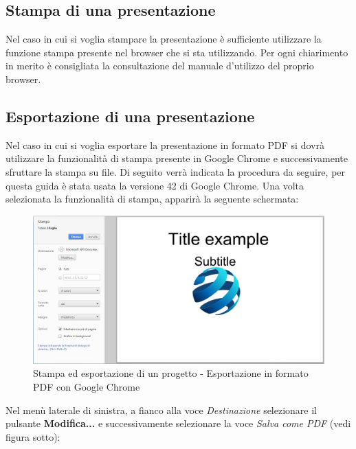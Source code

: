 \subsection{Stampa di una presentazione}
\noindent Nel caso in cui si voglia stampare la presentazione è sufficiente utilizzare la funzione stampa presente nel browser che si sta utilizzando. Per ogni chiarimento in merito è consigliata la consultazione del manuale d'utilizzo del proprio browser. 

\subsection{Esportazione di una presentazione}
Nel caso in cui si voglia esportare la presentazione in formato PDF si dovrà utilizzare la funzionalità di stampa presente in Google Chrome e successivamente sfruttare la stampa su file. Di seguito verrà indicata la procedura da seguire, per questa guida è stata usata la versione 42 di Google Chrome. Una volta selezionata la funzionalità di stampa, apparirà la seguente schermata:

\begin{figure}[H] 
	\centering 
	\includegraphics[scale=0.40] {img/print_google}
	\caption{Stampa ed esportazione di un progetto - Esportazione in formato PDF con Google Chrome} 
\end{figure}

\noindent Nel menù laterale di sinistra, a fianco alla voce \textit{Destinazione} selezionare il pulsante \textbf{Modifica...} e successivamente selezionare la voce \textit{Salva come PDF} (vedi figura sotto): 

